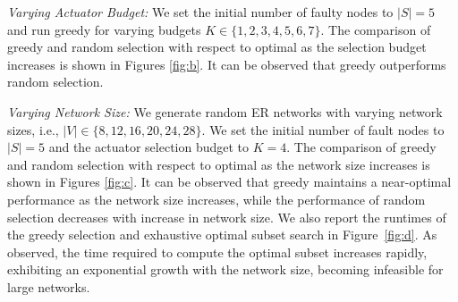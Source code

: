 \documentclass[twocolumn]{autart}    %
\begin{document}
\textit{Varying Actuator Budget: } We set the initial number of faulty nodes to $|S| = 5$ and run greedy for varying budgets $K \in \{1,2,3,4,5,6,7\}$. The comparison of greedy and random selection with respect to optimal as the selection budget increases is shown in Figures \ref{fig:b}. It can be observed that greedy outperforms random selection. 

\textit{Varying Network Size: }We generate random ER networks with varying network sizes, i.e., $|V| \in  \{8,12,16,20,24,28\}$. We set the initial number of fault nodes to $|S| = 5$ and the actuator selection budget to $K=4$. The comparison of greedy and random selection with respect to optimal as the network size increases is shown in Figures \ref{fig:c}. It can be observed that greedy maintains a near-optimal performance as the network size increases, while the performance of random selection decreases with increase in network size. {We also report the runtimes of the greedy selection and exhaustive optimal subset search in Figure~\ref{fig:d}. As observed, the time required to compute the optimal subset increases rapidly, exhibiting an exponential growth with the network size, becoming infeasible for large networks.}
 
\end{document}
